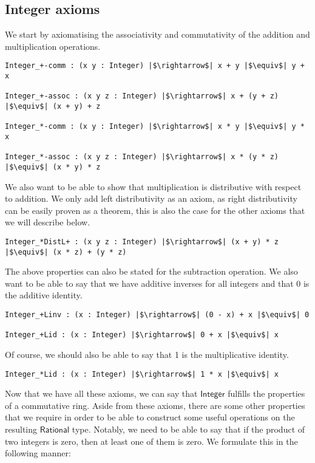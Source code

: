 \documentclass[12pt,twoside,maitrise]{dms}
\theoremstyle{definition}
\numberwithin{equation}{section}
\numberwithin{table}{chapter}
\numberwithin{figure}{chapter}
\newcommand\kw[1] {\textsf{#1}}
\begin{document}
\subsection*{Integer axioms}
We start by axiomatising the associativity and commutativity of the addition and multiplication operations.

\begin{verbatim}
Integer_+-comm : (x y : Integer) |$\rightarrow$| x + y |$\equiv$| y + x

Integer_+-assoc : (x y z : Integer) |$\rightarrow$| x + (y + z) |$\equiv$| (x + y) + z

Integer_*-comm : (x y : Integer) |$\rightarrow$| x * y |$\equiv$| y * x

Integer_*-assoc : (x y z : Integer) |$\rightarrow$| x * (y * z) |$\equiv$| (x * y) * z
\end{verbatim}

We also want to be able to show that multiplication is distributive with respect
to addition. We only add left distributivity as an axiom, as right
distributivity can be easily proven as a theorem, this is also the case for the
other axioms that we will describe below.

\begin{verbatim}
Integer_*DistL+ : (x y z : Integer) |$\rightarrow$| (x + y) * z |$\equiv$| (x * z) + (y * z)
\end{verbatim}

The above properties can also be stated for the subtraction operation. We also
want to be able to say that we have additive inverses for all integers and that
0 is the additive identity.

\begin{verbatim}
Integer_+Linv : (x : Integer) |$\rightarrow$| (0 - x) + x |$\equiv$| 0

Integer_+Lid : (x : Integer) |$\rightarrow$| 0 + x |$\equiv$| x
\end{verbatim}

Of course, we should also be able to say that 1 is the multiplicative identity.

\begin{verbatim}
Integer_*Lid : (x : Integer) |$\rightarrow$| 1 * x |$\equiv$| x
\end{verbatim}

Now that we have all these axioms, we can say that $\kw{Integer}$ fulfills the
properties of a commutative ring. Aside from these axioms, there are some other
properties that we require in order to be able to construct some useful
operations on the resulting $\kw{Rational}$ type. Notably, we need to be able to
say that if the product of two integers is zero, then at least one of them is
zero. We formulate this in the following manner:
\end{document}
